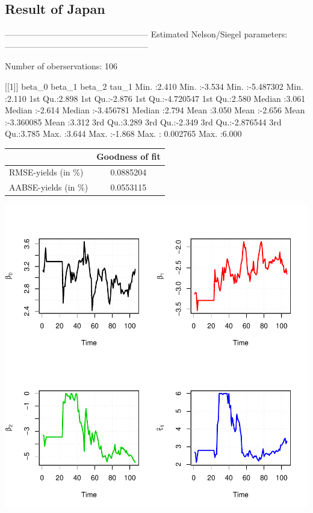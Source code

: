 \documentclass{article}
\begin{document}
\begin{spacing}{1.5}
\subsection{Result of Japan}
\begin{Schunk}
\begin{Soutput}
---------------------------------------------------
Estimated Nelson/Siegel parameters:
---------------------------------------------------

Number of oberservations: 106 

[[1]]
     beta_0          beta_1           beta_2              tau_1      
 Min.   :2.410   Min.   :-3.534   Min.   :-5.487302   Min.   :2.110  
 1st Qu.:2.898   1st Qu.:-2.876   1st Qu.:-4.720547   1st Qu.:2.580  
 Median :3.061   Median :-2.614   Median :-3.456781   Median :2.794  
 Mean   :3.050   Mean   :-2.656   Mean   :-3.360085   Mean   :3.312  
 3rd Qu.:3.289   3rd Qu.:-2.349   3rd Qu.:-2.876544   3rd Qu.:3.785  
 Max.   :3.644   Max.   :-1.868   Max.   : 0.002765   Max.   :6.000  
\end{Soutput}
\end{Schunk}

\begin{center}
\begin{tabular}{|l||c|}\hline
                        & Goodness of fit \\ \hline
RMSE-yields (in \%)     & 0.0885204   \\ \hline
AABSE-yields (in \%)    & 0.0553115   \\ \hline
\end{tabular}
\end{center}

\begin{center}
\includegraphics{Graduation_Paper-014}
\end{center}


\end{spacing}
\end{document}

